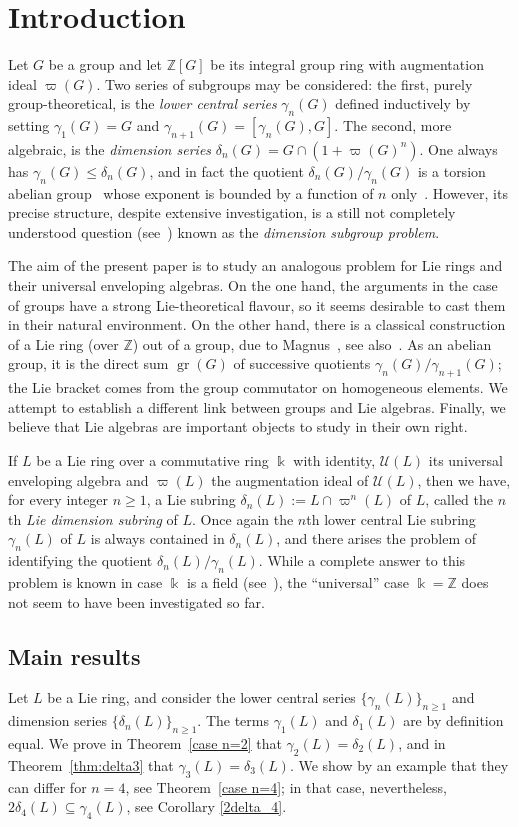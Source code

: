 \documentclass[a4paper,reqno,notitlepage]{amsart}
\theoremstyle{definition}
\newcommand{\Z}{\mathbb Z}
\newcommand\K{\Bbbk}
\newcommand\U{\mathscr U}
\newcommand\gr{\operatorname{gr}}
\begin{document}
\section{Introduction}
Let $G$ be a group and let $\Z[G]$ be its integral group ring with
augmentation ideal $\varpi(G)$. Two series of subgroups may be
considered: the first, purely group-theoretical, is the \emph{lower
  central series} $\gamma_n(G)$ defined inductively by setting
$\gamma_1(G)=G$ and $\gamma_{n+1}(G)=[\gamma_n(G),G]$. The second,
more algebraic, is the \emph{dimension series}
$\delta_n(G)=G\cap(1+\varpi(G)^n)$. One always has
$\gamma_n(G)\le\delta_n(G)$, and in fact the quotient
$\delta_n(G)/\gamma_n(G)$ is a torsion abelian
group~\cite{Gupta-Kuzmin:92} whose exponent is bounded by a function
of $n$ only~\cite{Sjogren:79}. However, its precise structure, despite
extensive investigation, is a still not completely understood question
(see~\cites{Gupta:87,MP:09,Passi:79}) known as the \emph{dimension
  subgroup problem}.

The aim of the present paper is to study an analogous problem for Lie
rings and their universal enveloping algebras. On the one hand, the
arguments in the case of groups have a strong Lie-theoretical
flavour, so it seems desirable to cast them in their natural
environment. On the other hand, there is a classical construction of a
Lie ring (over $\Z$) out of a group, due to Magnus~\cite{magnus:lie},
see also~\cite{labute:magnus}. As an abelian group, it is the direct
sum $\gr(G)$ of successive quotients $\gamma_n(G)/\gamma_{n+1}(G)$;
the Lie bracket comes from the group commutator on homogeneous
elements. We attempt to establish a different link between groups and
Lie algebras. Finally, we believe that Lie algebras are important
objects to study in their own right.

If $L$ be a Lie ring over a commutative ring $\K$ with identity,
$\U(L)$ its universal enveloping algebra and $\varpi(L)$ the
augmentation ideal of $\U(L)$, then we have, for every integer $n\geq
1$, a Lie subring $\delta_n(L):= L\cap \varpi^n(L)$ of $L$, called the
$n$th \emph{Lie dimension subring} of $L$. Once again the $n$th lower
central Lie subring $\gamma_n(L)$ of $L$ is always contained in
$\delta_n(L)$, and there arises the problem of identifying the
quotient $\delta_n(L)/\gamma_n(L)$. While a complete answer to this
problem is known in case $\K$ is a field
(see~\cites{Knus:1969,Riley:1995}), the ``universal'' case $\K=\Z$
does not seem to have been investigated so far.

\subsection{Main results}
Let $L$ be a Lie ring, and consider the lower central series
$\{\gamma_n(L)\}_{n\ge 1}$ and dimension series
$\{\delta_n(L)\}_{n\geq1}$. The terms $\gamma_1(L)$ and $\delta_1(L)$
are by definition equal. We prove in Theorem~\ref{case n=2} that
$\gamma_2(L)=\delta_2(L)$, and in Theorem~\ref{thm:delta3} that
$\gamma_3(L)=\delta_3(L)$. We show by an example that they can differ
for $n=4$, see Theorem~\ref{case n=4}; in that case, nevertheless,
$2\delta_4(L)\subseteq \gamma_4(L)$, see Corollary \ref{2delta_4}.
\end{document}
